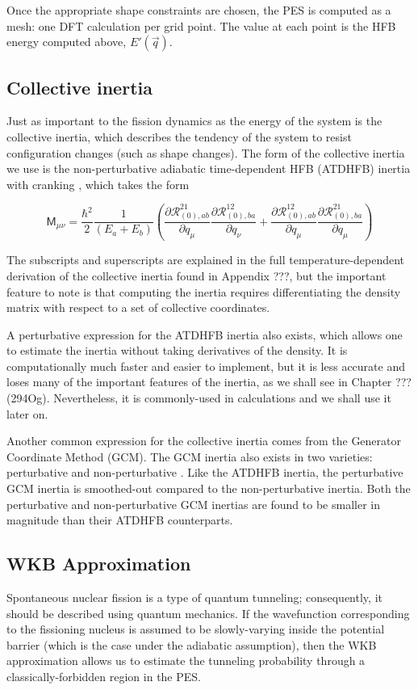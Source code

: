 Once the appropriate shape constraints are chosen, the PES is computed as a mesh: one DFT calculation per grid point. The value at each point is the HFB energy computed above, $E'(\vec{q})$.

\subsection{Collective inertia}
Just as important to the fission dynamics as the energy of the system is the collective inertia, which describes the tendency of the system to resist configuration changes (such as shape changes). The form of the collective inertia we use is the non-perturbative adiabatic time-dependent HFB (ATDHFB) inertia with cranking \cite{Baran2011}, which takes the form

\begin{equation}
\mathsf{M}_{\mu\nu} =  \frac{\hbar^2}{2}\frac{1}{(E_a+E_b)}\left(\frac{\partial\mathcal{R}^{21}_{(0),ab}}{\partial q_\mu}\frac{\partial\mathcal{R}^{12}_{(0),ba}}{\partial q_\nu}+\frac{\partial\mathcal{R}^{12}_{(0),ab}}{\partial q_\mu}\frac{\partial\mathcal{R}^{21}_{(0),ba}}{\partial q_\mu}\right)
\end{equation}

\noindent The subscripts and superscripts are explained in the full temperature-dependent derivation of the collective inertia found in Appendix ???, but the important feature to note is that computing the inertia requires differentiating the density matrix with respect to a set of collective coordinates.

A perturbative expression for the ATDHFB inertia also exists, which allows one to estimate the inertia without taking derivatives of the density. It is computationally much faster and easier to implement, but it is less accurate and loses many of the important features of the inertia, as we shall see in Chapter ??? (294Og). Nevertheless, it is commonly-used in calculations and we shall use it later on.

Another common expression for the collective inertia comes from the Generator Coordinate Method (GCM). The GCM inertia also exists in two varieties: perturbative and non-perturbative \cite{Giuliani2018b}. Like the ATDHFB inertia, the perturbative GCM inertia is smoothed-out compared to the non-perturbative inertia. Both the perturbative and non-perturbative GCM inertias are found to be smaller in magnitude than their ATDHFB counterparts.

\subsection{WKB Approximation}
Spontaneous nuclear fission is a type of quantum tunneling; consequently, it should be described using quantum mechanics. If the wavefunction corresponding to the fissioning nucleus is assumed to be slowly-varying inside the potential barrier (which is the case under the adiabatic assumption), then the WKB approximation allows us to estimate the tunneling probability through a classically-forbidden region in the PES.

